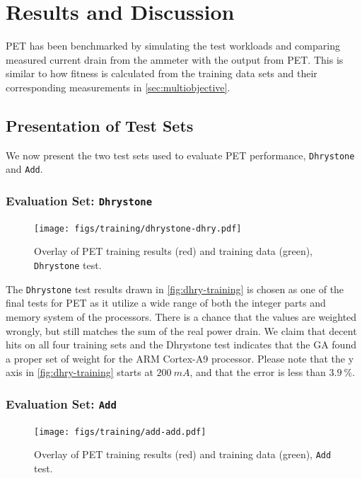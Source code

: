 \section{Results and Discussion}

PET has been benchmarked by simulating the test workloads and comparing measured
current drain from the ammeter with the output from PET. This is similar to how
fitness is calculated from the training data sets and their corresponding
measurements in \autoref{sec:multiobjective}.


\subsection{Presentation of Test Sets}

We now present the two test sets used to evaluate PET performance,
\texttt{Dhrystone} and \texttt{Add}.

\subsubsection{Evaluation Set: \texttt{Dhrystone}}

\begin{figure}[H]
\centering
\texttt{[image: figs/training/dhrystone-dhry.pdf]}
\caption{Overlay of PET training results (red) and training data (green),
\texttt{Dhrystone} test.}
\label{fig:dhry-training}
\end{figure}

The \texttt{Dhrystone} test results drawn in \autoref{fig:dhry-training} is chosen as one
of the final tests for PET as it utilize a wide range of both the integer parts
and memory system of the processors. There is a chance that the values are
weighted wrongly, but still matches the sum of the real power drain. We claim
that decent hits on all four training sets and the Dhrystone test indicates that
the GA found a proper set of weight for the ARM Cortex-A9 processor. Please note
that the y axis in \autoref{fig:dhry-training} starts at $200~mA$, and that the
error is less than $3.9~\%$.


\newpage

\subsubsection{Evaluation Set: \texttt{Add}}

\begin{figure}[ht]
\centering
\texttt{[image: figs/training/add-add.pdf]}
\caption{Overlay of PET training results (red) and training data (green),
\texttt{Add} test.}
\label{fig:add-training}
\end{figure}

